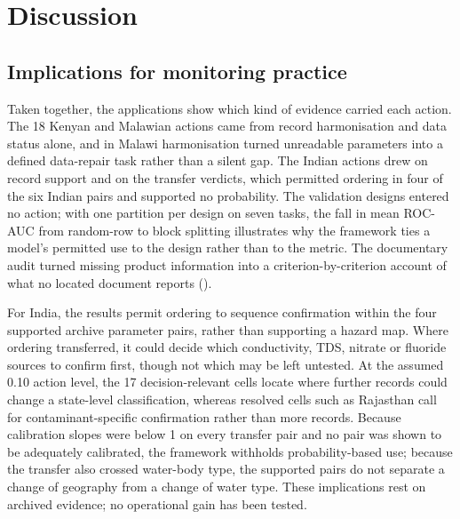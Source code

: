 \documentclass[10pt,letterpaper]{article}
\begin{document}
\FloatBarrier

\section*{Discussion}

\subsection*{Implications for monitoring practice}

Taken together, the applications show which kind of evidence carried each action. The 18 Kenyan and Malawian actions came from record harmonisation and data status alone, and in Malawi harmonisation turned unreadable parameters into a defined data-repair task rather than a silent gap. The Indian actions drew on record support and on the transfer verdicts, which permitted ordering in four of the six Indian pairs and supported no probability. The validation designs entered no action; with one partition per design on seven tasks, the fall in mean ROC-AUC from random-row to block splitting illustrates why the framework ties a model's permitted use to the design rather than to the metric. The documentary audit turned missing product information into a criterion-by-criterion account of what no located document reports ().

For India, the results permit ordering to sequence confirmation within the four supported archive \texttimes{} parameter pairs, rather than supporting a hazard map. Where ordering transferred, it could decide which conductivity, TDS, nitrate or fluoride sources to confirm first, though not which may be left untested. At the assumed 0.10 action level, the 17 decision-relevant cells locate where further records could change a state-level classification, whereas resolved cells such as Rajasthan call for contaminant-specific confirmation rather than more records. Because calibration slopes were below 1 on every transfer pair and no pair was shown to be adequately calibrated, the framework withholds probability-based use; because the transfer also crossed water-body type, the supported pairs do not separate a change of geography from a change of water type. These implications rest on archived evidence; no operational gain has been tested.
\end{document}
